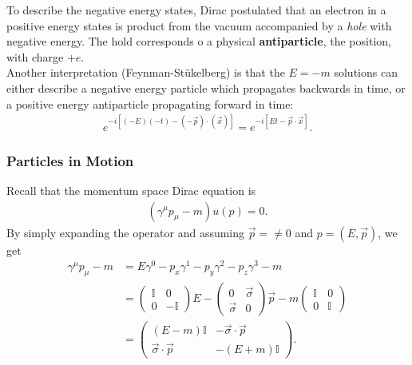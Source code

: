\documentclass{book}
\theoremstyle{definition}
\newcommand{\nn}{\nonumber}
\begin{document}
To describe the negative energy states, Dirac postulated that an electron in a positive energy states is product from the vacuum accompanied by a \textit{hole} with negative energy. The hold corresponds o a physical \textbf{antiparticle}, the position, with charge $+e$.\\

Another interpretation (Feynman-St\"{u}kelberg) is that the $E=-m$ solutions can either describe a negative energy particle which propagates backwards in time, or a positive energy antiparticle propagating forward in time:
\begin{align}
e^{-i[(-E)(-t) - (-\vec{p})\cdot(\vec{x})]} = e^{-i[Et - \vec{p}\cdot\vec{x}]}.
\end{align}








\subsubsection{Particles in Motion}

Recall that the momentum space Dirac equation is 
\begin{align}
(\gamma^\mu p_\mu - m)u(p) = 0.
\end{align}
By simply expanding the operator and assuming $\vec{p} = \neq 0$ and $p = (E,\vec{p})$, we get
\begin{align}
\gamma^\mu p_\mu - m &= E \gamma^0 - p_x\gamma^1 - p_y \gamma^2 - p_z\gamma^3 - m \nn\\
&= \begin{pmatrix}
\mathbb{I} & 0 \\ 0 & -\mathbb{I}
\end{pmatrix}E - 
\begin{pmatrix}
0 & \vec{\sigma} \\ \vec{\sigma} & 0
\end{pmatrix}\vec{p} - m\begin{pmatrix}
\mathbb{I} & 0 \\0 & \mathbb{I}
\end{pmatrix}\nn\\
&= \begin{pmatrix}
(E-m)\mathbb{I} & -\vec{\sigma}\cdot\vec{p} \\ \vec{\sigma}\cdot\vec{p} & -(E+m)\mathbb{I}
\end{pmatrix}.
\end{align}
\end{document}
